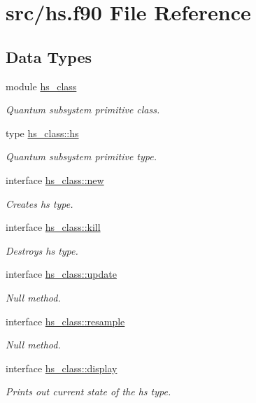 \hypertarget{hs_8f90}{\section{src/hs.f90 File Reference}
\label{hs_8f90}
}
\subsection*{Data Types}
\begin{DoxyCompactItemize}
\item 
module \hyperlink{classhs__class}{hs\+\_\+class}
\begin{DoxyCompactList}\small\item\em Quantum subsystem primitive class. \end{DoxyCompactList}\item 
type \hyperlink{strucths__class_1_1hs}{hs\+\_\+class\+::hs}
\begin{DoxyCompactList}\small\item\em Quantum subsystem primitive type. \end{DoxyCompactList}\item 
interface \hyperlink{interfacehs__class_1_1new}{hs\+\_\+class\+::new}
\begin{DoxyCompactList}\small\item\em Creates hs type. \end{DoxyCompactList}\item 
interface \hyperlink{interfacehs__class_1_1kill}{hs\+\_\+class\+::kill}
\begin{DoxyCompactList}\small\item\em Destroys hs type. \end{DoxyCompactList}\item 
interface \hyperlink{interfacehs__class_1_1update}{hs\+\_\+class\+::update}
\begin{DoxyCompactList}\small\item\em Null method. \end{DoxyCompactList}\item 
interface \hyperlink{interfacehs__class_1_1resample}{hs\+\_\+class\+::resample}
\begin{DoxyCompactList}\small\item\em Null method. \end{DoxyCompactList}\item 
interface \hyperlink{interfacehs__class_1_1display}{hs\+\_\+class\+::display}
\begin{DoxyCompactList}\small\item\em Prints out current state of the hs type. \end{DoxyCompactList}\item 

\end{DoxyCompactItemize}
